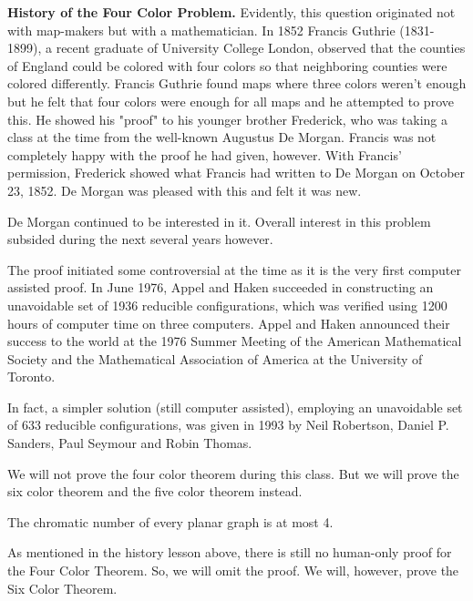 \begin{distraction}
  \noindent\textbf{History of the Four Color Problem.}
  Evidently, this question originated not with map-makers but 
  with a mathematician. In 1852 Francis Guthrie (1831-1899), a
  recent graduate of University College London, observed that the 
  counties of England could be colored with four colors so that
  neighboring counties were colored differently. Francis Guthrie 
  found maps where three colors weren't enough but he felt that
  four colors were enough for all maps and he attempted to prove
  this. He showed his "proof" to his younger brother Frederick,
  who was taking a class at the time from the well-known Augustus
  De Morgan. Francis was not completely happy with the proof he 
  had given, however. With Francis' permission, Frederick showed 
  what Francis had written to De Morgan on October 23, 1852. De
  Morgan was pleased with this and felt it was new.

  De Morgan continued to be interested in it. Overall interest in
  this problem subsided during the next several years however.

  The proof initiated some controversial at the time as it is
  the very first computer assisted proof. In June 1976, Appel and
  Haken succeeded in constructing an unavoidable set of 1936
  reducible configurations, which was verified using 1200 hours
  of computer time on three computers. Appel and Haken announced
  their success to the world at the 1976 Summer Meeting of the
  American Mathematical Society and the Mathematical Association
  of America at the University of Toronto.

  In fact, a simpler solution (still computer assisted), employing
  an unavoidable set of 633 reducible configurations, was given in
  1993 by Neil Robertson, Daniel P. Sanders, Paul Seymour and 
  Robin Thomas.

  We will not prove the four color theorem during this class.
  But we will prove the six color theorem and the five color 
  theorem instead.
\end{distraction}

\begin{theorem}
  The chromatic number of every planar graph is at most 4.
\end{theorem}

As mentioned in the history lesson above, there is still no
human-only proof for the Four Color Theorem. So, we will omit the
proof. We will, however, prove the Six Color Theorem.

